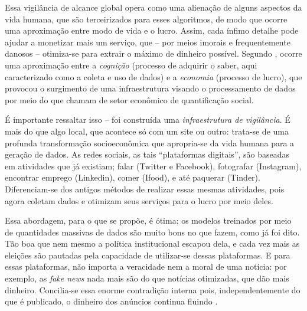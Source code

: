 
Essa vigilância de alcance global opera como uma alienação de alguns aspectos da vida humana, que são terceirizados para esses algoritmos, de modo que ocorre uma aproximação entre modo de vida e o lucro.
Assim, cada ínfimo detalhe pode ajudar a monetizar mais um serviço, que -- por meios imorais e frequentemente danosos -- otimiza-se para extrair o máximo de dinheiro possível.
Segundo \textcite{mejias_data_2024}, ocorre uma aproximação entre a \textit{cognição} (processo de adquirir o saber, aqui caracterizado como a coleta e uso de dados) e a \textit{economia} (processo de lucro), que provocou o surgimento de uma infraestrutura visando o processamento de dados por meio do que chamam de setor econômico de quantificação social.

É importante ressaltar isso -- foi construída uma \textit{infraestrutura de vigilância}.
É mais do que algo local, que acontece só com um site ou outro: trata-se de uma profunda transformação socioeconômica que apropria-se da vida humana para a geração de dados.
As redes sociais, as tais ``plataformas digitais'', são baseadas em atividades que já existiam; falar (Twitter e Facebook), fotografar (Instagram), encontrar emprego (Linkedin), comer (Ifood), e até paquerar (Tinder).
Diferenciam-se dos antigos métodos de realizar essas mesmas atividades, pois agora coletam dados e otimizam seus serviços para o lucro por meio deles.

Essa abordagem, para o que se propõe, é ótima; os modelos treinados por meio de quantidades massivas de dados são muito bons no que fazem, como já foi dito.
Tão boa que nem mesmo a política institucional escapou dela, e cada vez mais as eleições são pautadas pela capacidade de utilizar-se dessas plataformas.
E para essas plataformas, não importa a veracidade nem a moral de uma notícia: por exemplo, as \textit{fake news} nada mais são do que notícias otimizadas, que dão mais dinheiro.
Concilia-se essa enorme contradição interna pois, independentemente do que é publicado, o dinheiro dos anúncios continua fluindo \cite{morozov_big_2018}.

